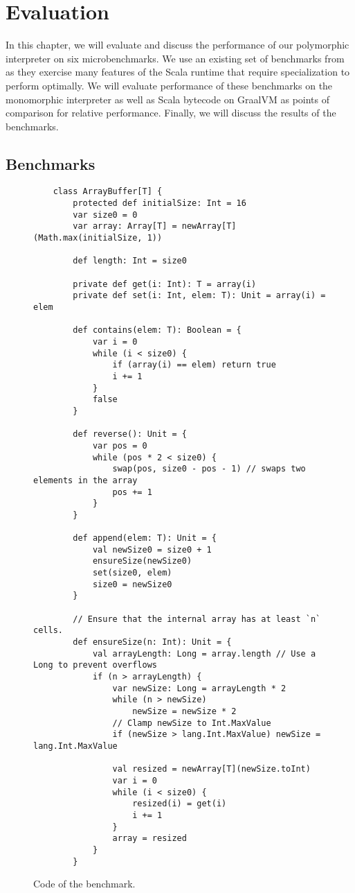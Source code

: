 \chapter{Evaluation}

In this chapter, we will evaluate and discuss the performance of our polymorphic interpreter on six microbenchmarks.
We use an existing set of benchmarks from \cite{scala:miniboxing} as they exercise many features of the Scala runtime that require specialization to perform optimally.
We will evaluate performance of these benchmarks on the monomorphic interpreter as well as Scala bytecode on GraalVM as points of comparison for relative performance.
Finally, we will discuss the results of the benchmarks.

\section{Benchmarks}
\begin{figure}[!htb]
	\begin{verbatim}
	class ArrayBuffer[T] {
		protected def initialSize: Int = 16
		var size0 = 0
		var array: Array[T] = newArray[T](Math.max(initialSize, 1))
		
		def length: Int = size0
		
		private def get(i: Int): T = array(i)
		private def set(i: Int, elem: T): Unit = array(i) = elem
		
		def contains(elem: T): Boolean = {
			var i = 0
			while (i < size0) {
				if (array(i) == elem) return true
				i += 1
			}
			false
		}
		
		def reverse(): Unit = {
			var pos = 0
			while (pos * 2 < size0) {
				swap(pos, size0 - pos - 1) // swaps two elements in the array
				pos += 1
			}
		}
		
		def append(elem: T): Unit = {
			val newSize0 = size0 + 1
			ensureSize(newSize0)
			set(size0, elem)
			size0 = newSize0
		}
		
		// Ensure that the internal array has at least `n` cells. 
		def ensureSize(n: Int): Unit = {
			val arrayLength: Long = array.length // Use a Long to prevent overflows
			if (n > arrayLength) {
				var newSize: Long = arrayLength * 2
				while (n > newSize)
					newSize = newSize * 2
				// Clamp newSize to Int.MaxValue
				if (newSize > lang.Int.MaxValue) newSize = lang.Int.MaxValue
				
				val resized = newArray[T](newSize.toInt)
				var i = 0
				while (i < size0) {
					resized(i) = get(i)
					i += 1
				}
				array = resized
			}
		}
	\end{verbatim}
	\caption{Code of the  benchmark.}
	\label{example:arraybuffer-benchmark}
\end{figure}

